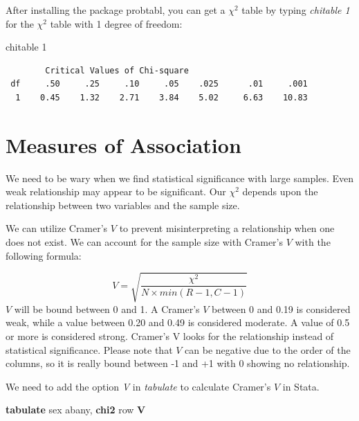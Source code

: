 \documentclass[
]{book}
\newenvironment{Shaded}{\begin{snugshade}}{\end{snugshade}}
\newcommand{\FunctionTok}[1]{\textcolor[rgb]{0.13,0.29,0.53}{\textbf{#1}}}
\newcommand{\KeywordTok}[1]{\textcolor[rgb]{0.13,0.29,0.53}{\textbf{#1}}}
\newcommand{\NormalTok}[1]{#1}
\newcommand{\OtherTok}[1]{\textcolor[rgb]{0.56,0.35,0.01}{#1}}
\begin{document}
After installing the package probtabl, you can get a \(\chi^2\) table by typing \emph{chitable 1} for the \(\chi^2\) table with 1 degree of freedom:

\begin{Shaded}
\begin{Highlighting}[]
\NormalTok{chitable 1}
\end{Highlighting}
\end{Shaded}

\begin{verbatim}
        Critical Values of Chi-square
 df     .50     .25     .10     .05    .025      .01     .001
  1    0.45    1.32    2.71    3.84    5.02     6.63    10.83
\end{verbatim}

\section{Measures of Association}\label{measures-of-association}

We need to be wary when we find statistical significance with large samples. Even weak relationship may appear to be significant. Our \(\chi^2\) depends upon the relationship between two variables and the sample size.

We can utilize Cramer's \(V\) to prevent misinterpreting a relationship when one does not exist. We can account for the sample size with Cramer's \(V\) with the following formula:

\[ V=\sqrt{ \frac{\chi^2}{N \times min(R-1,C-1)}} \]
\(V\) will be bound between 0 and 1. A Cramer's \(V\) between 0 and 0.19 is considered weak, while a value between 0.20 and 0.49 is considered moderate. A value of 0.5 or more is considered strong. Cramer's V looks for the relationship instead of statistical significance. Please note that \(V\) can be negative due to the order of the columns, so it is really bound between -1 and +1 with 0 showing no relationship.

We need to add the option \emph{V} in \emph{tabulate} to calculate Cramer's \(V\) in Stata.

\begin{Shaded}
\begin{Highlighting}[]
\KeywordTok{tabulate}\NormalTok{ sex abany, }\FunctionTok{chi2} \OtherTok{row} \KeywordTok{V}
\end{Highlighting}
\end{Shaded}
\end{document}
